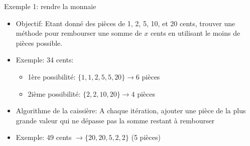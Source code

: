 \begin{frame}{Exemple 1: rendre la monnaie}

\begin{itemize}
\item Objectif: Etant donné des pièces de 1, 2, 5, 10, et 20
  cents, trouver une méthode pour rembourser une somme de $x$ cents en
  utilisant le moins de pièces possible.
\item Exemple: 34 cents:
\begin{itemize}
\item 1ère possibilité: $\{1,1,2,5,5,20\} \rightarrow 6$ pièces
\item 2ième possibilité: $\{2,2,10,20\} \rightarrow 4$ pièces
\end{itemize}
\bigskip

\item Algorithme de la caissière: A chaque itération, ajouter une
  pièce de la plus grande valeur qui ne dépasse pas la somme restant à rembourser
\item Exemple: 49 cents $\rightarrow \{20,20,5,2,2\}$ (5 pièces)
\end{itemize}


\end{frame}

